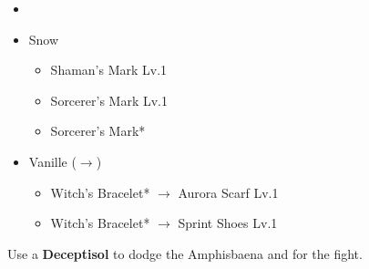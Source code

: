 \begin{menu}
	\begin{itemize}
	\paradigm
		\begin{itemize}
			\item {}%
				{\paradigmline[4]{(\rav)}{\rav}{\sab}}%
				{\paradigmline{\com}{(\com)}{(\com)}}%
				{\paradigmline{\com}{\sen}{\med}}%
				{\paradigmline{\syn}{\sen}{(\sab)}}%
				{\paradigmline{\rav}{(\rav)}{\med}}%
				{\paradigmline{(\com)}{(\com)}{\med}}%
		\end{itemize}
	\equip
		\begin{itemize}
			\item Snow
				\begin{itemize}
					\item Shaman's Mark Lv.1
					\item Sorcerer's Mark Lv.1
					\item Sorcerer's Mark*
				\end{itemize}
			\item Vanille ($\rightarrow$)
				\begin{itemize}
					\item Witch's Bracelet* $\rightarrow$ Aurora Scarf Lv.1
					\item Witch's Bracelet* $\rightarrow$ Sprint Shoes Lv.1
				\end{itemize}
		\end{itemize}
	\end{itemize}
\end{menu}

\renewcommand{\first}{[1] Smart Bomb (\rav/\rav/\sab)}
\renewcommand{\second}{[2] Cerberus (\com/\com/\com)}
\renewcommand{\third}{[3] Solidarity (\com/\sen/\med)}
\renewcommand{\fourth}{[4] Premeditation (\syn/\sen/\sab)}
\renewcommand{\fifth}{[5] Thaumaturgy (\rav\rav\med)}
\renewcommand{\sixth}{[6] Tireless Charge (\com/\com/\med)}

Use a \textbf{Deceptisol} to dodge the Amphisbaena and for the fight.

